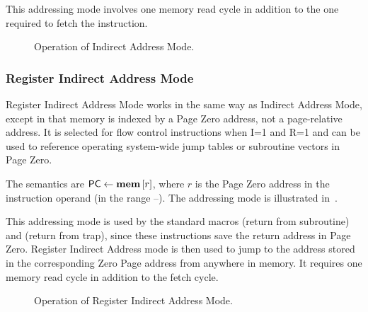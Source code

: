 This addressing mode involves one memory read cycle in addition to the one
required to fetch the instruction.

\begin{figure}[htb]
 \centering
\caption[Indirect Address Mode]{\label{fig:indirect-address-mode} Operation
  of Indirect Address Mode.}
\end{figure}


\subsubsection{Register Indirect Address Mode}
\label{sec:register-indirect-address-mode}

Register Indirect Address Mode works in the same way as Indirect Address Mode,
except in that memory is indexed by a Page Zero address, not a page-relative
address. It is selected for flow control instructions when I=1 and R=1 and can
be used to reference operating system-wide jump tables or subroutine vectors in
Page Zero.

The semantics are $\mbox{\PC}\eq\mem{r}$, where $r$ is the \gls{Page Zero}
address in the instruction operand (in the range –). The
addressing mode is illustrated in~.

This addressing mode is used by the standard macros  (return from
subroutine) and  (return from trap), since these instructions save the
return address in \gls{Page Zero}. Register Indirect Address mode is then used
to jump to the address stored in the corresponding Zero Page address from
anywhere in memory. It requires one memory read cycle in addition to the fetch
cycle.

\begin{figure}[htb]
 \centering
\caption[Register Indirect Address Mode]{\label{fig:register-indirect-address-mode} Operation
  of Register Indirect Address Mode.}
\end{figure}





